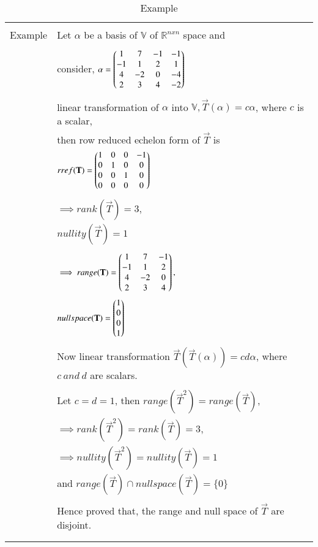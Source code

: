 \begin{longtable}{|l|l|}
\hline
\multirow{3}{*}{Example} & \\
& Let $\alpha$ be a basis of $\mathbb{V}$ of $\mathbb{R}^{nxn}$ space and\\
& \\
& consider, $\alpha = \begin{pmatrix}1&7&-1&-1\\-1&1&2&1\\4&-2&0&-4\\2&3&4&-2\end{pmatrix}$\\
& \\
& linear transformation of $\alpha$ into $\mathbb{V}, \vec{T}(\alpha) = c\alpha$, where $c$ is a scalar,\\
& then row reduced echelon form of $\vec{T}$ is\\
& $rref(\mathbf{T}) = \begin{pmatrix}1&0&0&-1\\0&1&0&0\\0&0&1&0\\0&0&0&0\end{pmatrix}$\\
& \\
& $\implies rank(\vec{T}) = 3,$\\
& $nullity(\vec{T}) = 1$\\
& \\
& $\implies range(\mathbf{T}) = \begin{pmatrix}1&7&-1\\-1&1&2\\4&-2&0\\2&3&4\end{pmatrix},$\\
& $null space(\mathbf{T}) = \begin{pmatrix}1\\0\\0\\1\end{pmatrix}$\\
& \\
& Now linear transformation $\vec{T}(\vec{T}(\alpha)) = cd\alpha$, where $c \  and \  d$ are scalars.\\
& \\
& Let $ c = d = 1$, then $range(\vec{T}^2) = range (\vec{T})$,\\
& $\implies rank (\vec{T}^2) = rank (\vec{T}) = 3$,\\
& $\implies nullity (\vec{T}^2) = nullity (\vec{T}) = 1$\\
& and $range(\vec{T}) \cap nullspace(\vec{T}) = \lbrace 0\rbrace$\\
& \\
& Hence proved that, the range and null space of $\vec{T}$ are disjoint.\\
& \\
\hline
\caption{Example}
\label{eq:solutions/3/2/11/table:2}
\end{longtable}
\twocolumn

